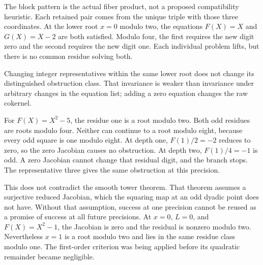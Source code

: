 The block pattern is the actual fiber product, not a proposed compatibility heuristic. Each retained pair comes from the unique triple with those three coordinates.
At the lower root $x=0$ modulo two, the equations $F(X)=X$ and $G(X)=X-2$ are both satisfied. Modulo four, the first requires the new digit zero and the second requires the new digit one. Each individual problem lifts, but there is no common residue solving both.

Changing integer representatives within the same lower root does not change its distinguished obstruction class. That invariance is weaker than invariance under arbitrary changes in the equation list; adding a zero equation changes the raw cokernel.

For $F(X)=X^2-5$, the residue one is a root modulo two. Both odd residues are roots modulo four. Neither can continue to a root modulo eight, because every odd square is one modulo eight.
At depth one, $F(1)/2=-2$ reduces to zero, so the zero Jacobian causes no obstruction. At depth two, $F(1)/4=-1$ is odd. A zero Jacobian cannot change that residual digit, and the branch stops. The representative three gives the same obstruction at this precision.

This does not contradict the smooth tower theorem. That theorem assumes a surjective reduced Jacobian, which the squaring map at an odd dyadic point does not have. Without that assumption, success at one precision cannot be reused as a promise of success at all future precisions.
At $x=0$, $L=0$, and $F(X)=X^2-1$, the Jacobian is zero and the residual is nonzero modulo two. Nevertheless $x=1$ is a root modulo two and lies in the same residue class modulo one. The first-order criterion was being applied before its quadratic remainder became negligible.

